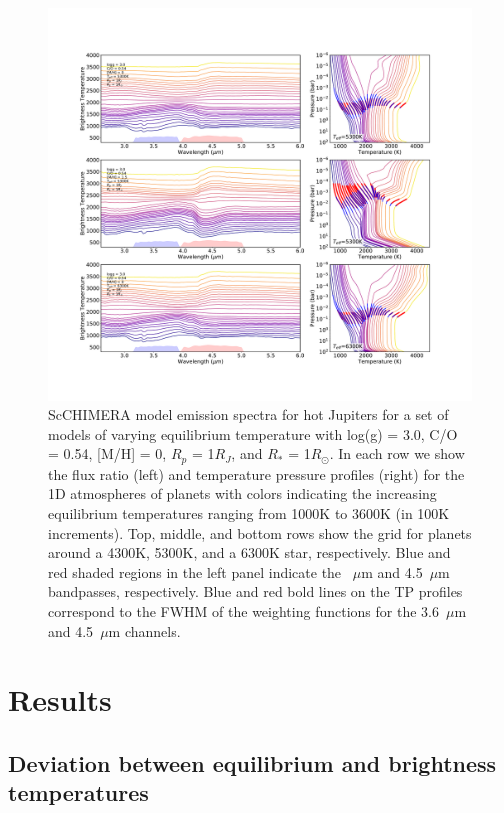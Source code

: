 \begin{figure}
    \centering
    \includegraphics[width=\linewidth]{SpectraTPweight.pdf}
    \caption{ScCHIMERA model emission spectra for hot Jupiters \citep{Piskorz2018} for a set of models of varying equilibrium temperature with log(g) = 3.0, C/O = 0.54, [M/H] = 0, $R_p$ = 1$R_J$, and $R_*$ = 1$R_\odot$. In each row we show the flux ratio (left) and temperature pressure profiles (right) for the 1D atmospheres of planets with colors indicating the increasing equilibrium temperatures ranging from 1000K to 3600K (in 100K increments). Top, middle, and bottom rows show the grid for planets around a 4300K, 5300K, and a 6300K star, respectively. Blue and red shaded regions in the left panel indicate the ~$\mu$m and 4.5~$\mu$m bandpasses, respectively. Blue and red bold lines on the TP profiles correspond to the FWHM of the weighting functions for the 3.6~$\mu$m and 4.5~$\mu$m channels.}
    \label{P2:fig:Linemodels}
\end{figure}



\section{Results}
\label{P2:sec:results}

\subsection{Deviation between equilibrium and brightness temperatures}
\label{P2:sec:individualTb}


